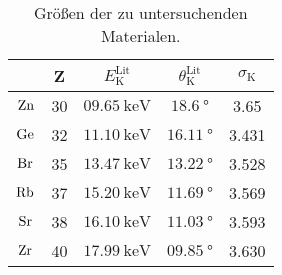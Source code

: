     \begin{table}
        \centering
        \caption{Größen der zu untersuchenden Materialen.}
        \begin{tabular}{c c c c c}
            \toprule
            & {Z} & {$E^\text{Lit}_\text{K}$} & {$\theta^\text{Lit}_\text{K}$} & {$\sigma_\text{K}$}\\
            \midrule
            $\ce{Zn}$ & 30 & $\SI{09.65}{\kilo\electronvolt}$ & $\SI{18.6}{\degree}$ & 3.65 \\
            $\ce{Ge}$ & 32 & $\SI{11.10}{\kilo\electronvolt}$ & $\SI{16.11}{\degree}$ & 3.431 \\
            $\ce{Br}$ & 35 & $\SI{13.47}{\kilo\electronvolt}$ & $\SI{13.22}{\degree}$ & 3.528 \\
            $\ce{Rb}$ & 37 & $\SI{15.20}{\kilo\electronvolt}$ & $\SI{11.69}{\degree}$ & 3.569 \\
            $\ce{Sr}$ & 38 & $\SI{16.10}{\kilo\electronvolt}$ & $\SI{11.03}{\degree}$ & 3.593 \\
            $\ce{Zr}$ & 40 & $\SI{17.99}{\kilo\electronvolt}$ & $\SI{09.85}{\degree}$ & 3.630 \\
            \bottomrule
        \end{tabular}
    \end{table}

    
    

    